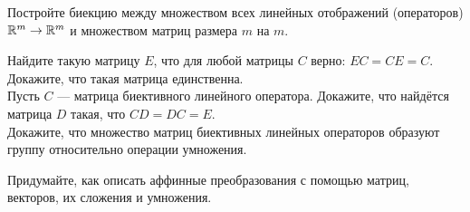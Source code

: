 \documentclass[a4paper,12pt]{article}
\begin{document}
    Постройте биекцию между множеством всех линейных отображений (операторов) $\mathbb{R}^m\rightarrow\mathbb{R}^m$ и множеством матриц размера $m$ на $m$.


    Найдите такую матрицу $E$, что для любой матрицы $C$ верно: $EC = CE = C$.\\
    Докажите, что такая матрица единственна.\\
    Пусть $C$ --- матрица биективного линейного оператора. Докажите, что найдётся матрица $D$ такая, что $CD=DC=E$.\\
    Докажите, что множество матриц биективных линейных операторов образуют группу относительно операции умножения.


    Придумайте, как описать аффинные преобразования с помощью матриц, векторов, их сложения и умножения.


\end{document}
